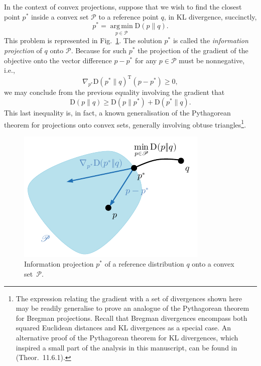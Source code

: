 In the context of convex projections, suppose that we wish to find the closest point $p^*$ inside a convex set $\mathscr{P}$ to a reference point $q$, in KL divergence, succinctly,
\begin{equation*}
p^*=\operatorname*{arg\,min}_{p\in\mathscr{P}} \mathrm{D}(p\|q).
\end{equation*}
This problem is represented in Fig.~\ref{fig:1}. The solution $p^*$ is called the \emph{information projection} of $q$ onto $\mathscr{P}$. Because for such $p^*$ the projection of the gradient of the objective onto the vector difference $p-p^*$ for any $p\in\mathscr{P}$ must be nonnegative, i.e.,
\begin{equation*}
\nabla_{p^*}\mathrm{D}(p^*\|q)^\mathrm{T}(p-p^*)\geqslant 0,
\end{equation*}
we may conclude from the previous equality involving the gradient that
\begin{equation*}
\mathrm{D}(p\|q)\geqslant\mathrm{D}(p\|p^*)+\mathrm{D}(p^*\|q).
\end{equation*}
This last inequality is, in fact, a known generalisation of the Pythagorean theorem for projections onto convex sets, generally involving obtuse triangles\footnote{The expression relating the gradient with a set of divergences shown here may be readily generalise to prove an analogue of the Pythagorean theorem for Bregman projections. Recall that Bregman divergences encompass both squared Euclidean distances and KL divergences as a special case. An alternative proof of the Pythagorean theorem for KL divergences, which inspired a small part of the analysis in this manuscript, can be found in~\cite{Cover06B} (Theor.~11.6.1).}.

\begin{figure}[htb]
\centering
\includegraphics[scale=\FigScale]{figures/ConvProj.pdf}
\caption{Information projection $p^*$ of a reference distribution $q$ onto a convex set~$\mathscr{P}$.}
\label{fig:1}
\end{figure}

